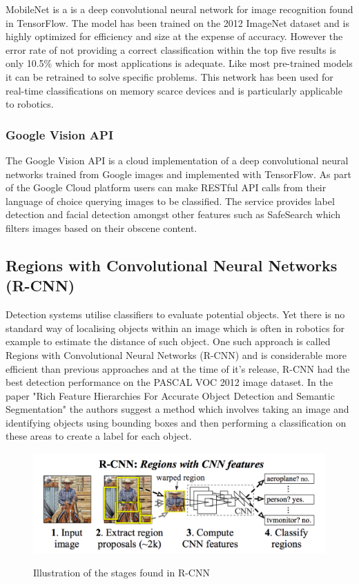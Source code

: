 \documentclass{mproj}
\begin{document}
MobileNet is a is a deep convolutional neural network for image recognition found in TensorFlow\cite{HowardZCKWWAA17}. The model has been trained on the 2012 ImageNet dataset and is highly optimized for efficiency and size at the expense of accuracy. However the error rate of not providing a correct classification within the top five results is only 10.5\% which for most applications is adequate. Like most pre-trained models it can be retrained to solve specific problems. This network has been used for real-time classifications on memory scarce devices and is particularly applicable to robotics.
  
  \subsubsection{Google Vision API}
  
The Google Vision API is a cloud implementation of a deep convolutional neural networks trained from Google images and implemented with TensorFlow. As part of the Google Cloud platform users can make RESTful API calls from their language of choice querying images to be classified. The service provides label detection and facial detection amongst other features such as SafeSearch which filters images based on their obscene content\cite{googlevision}.

\subsection{Regions with Convolutional Neural Networks (R-CNN)}

Detection systems utilise classifiers to evaluate potential objects. Yet there is no standard way of localising objects within an image which is often in robotics for example to estimate the distance of such object. One such approach is called Regions with Convolutional Neural Networks (R-CNN) and is considerable more efficient than previous approaches and at the time of it's release, R-CNN had the best detection performance on the PASCAL VOC 2012 image dataset. In the paper "Rich Feature Hierarchies For Accurate Object Detection and Semantic Segmentation"\cite{Girshick2014} the authors suggest a method which involves taking an image and identifying objects using bounding boxes and then performing a classification on these areas to create a label for each object. 

\begin{figure}[h]
  \caption{Illustration of the stages found in R-CNN}
  \centering
  \includegraphics[width=1.0\textwidth]{images/RCNN.png}
  \label{fig:RCNN Diagram}
\end{figure}
\end{document}
